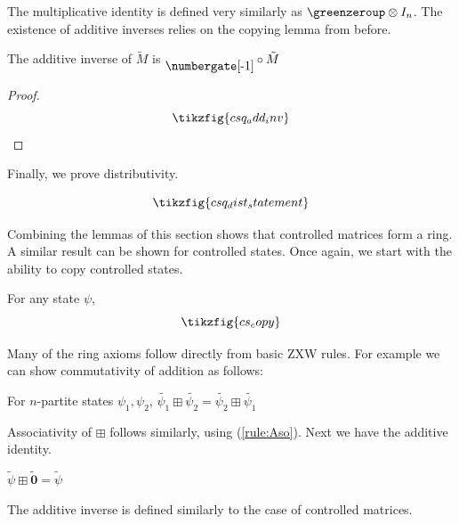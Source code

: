 The multiplicative identity is defined very similarly as $\greenzeroup \otimes I_n$. The existence of additive inverses relies on the copying lemma from before.

\begin{lemma}
    The additive inverse of $\tilde{M}$ is $\raisebox{-5pt}{\numbergate[-1]} \circ \tilde{M} $
\end{lemma}
\begin{proof}
    \begin{equation}
        \tikzfig{csq_add_inv}
    \end{equation}
\end{proof}

Finally, we prove distributivity.

\begin{lemma}\label{lem:csq_dist}
    \begin{equation}
        \tikzfig{csq_dist_statement}
    \end{equation}
\end{lemma}


Combining the lemmas of this section shows that controlled matrices form a ring. A similar result can be shown for controlled states. Once again, we start with the ability to copy controlled states. 
\begin{lemma}\label{lem:cscopy}
    For any state $\psi$,
    \begin{equation}\label{eq:cs_copy}
        \tikzfig{cs_copy}
    \end{equation}
\end{lemma}

Many of the ring axioms follow directly from basic ZXW rules. For example we can show commutativity of addition as follows:

\begin{lemma}\label{lem:csaddcomm}
    For $n$-partite states $\psi_1, \psi_2$, $\tilde{\psi_1} \boxplus \tilde{\psi_2} = \tilde{\psi_2} \boxplus \tilde{\psi_1}  $
\end{lemma}

Associativity of $\boxplus$ follows similarly, using (\ref{rule:Aso}). Next we have the additive identity.

\begin{lemma}\label{lem:csaddid}
    $\tilde{\psi} \boxplus\mathbf{\tilde{0}} = \tilde{\psi}$
\end{lemma}


The additive inverse is defined similarly to the case of controlled matrices. 


